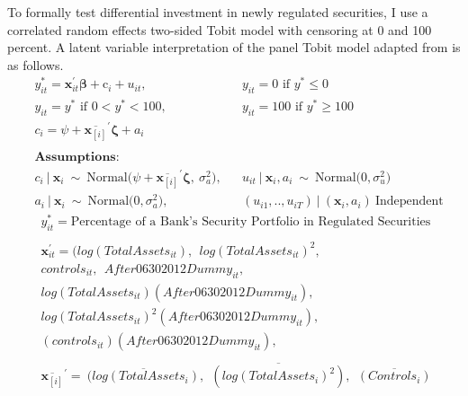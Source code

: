 \documentclass[preprint,12pt]{elsarticle}
\begin{document}
To formally test differential investment in newly regulated securities, I use a correlated random effects two-sided Tobit model with censoring at 0 and 100 percent.  A latent variable interpretation of the panel Tobit model adapted from \citep{Wooldridge2010} is as follows.
\begin{align*}
&y_{it}^{*} = \bm{x}_{it}^{'}\bm{\beta} + \text{c}_{i} + u_{it}, & &y_{it} = 0 \text{ if } y^{*} \leq 0 \nonumber \\
&y_{it} = y^{*} \text{ if } 0 < y^{*} < 100, & &y_{it} = 100 \text{ if } y^{*} \geq 100 \nonumber \\
&c_{i} = \psi + \overline{\bm{x}_{[i]}}^{'}\bm{\zeta} + a_{i} & 
\\
&\\
&\textbf{Assumptions:} \\
&c_{i} \ | \ \bm{x}_{i} \ \sim \ \text{Normal(} \psi + \overline{\bm{x}_{[i]}}^{'}\bm{\zeta}, \ \sigma_{a}^{2} \text{)}, & &u_{it} \ | \ \bm{x}_{i}, a_{i} \ \sim \ \text{Normal(} 0, \sigma_{u}^{2} \text{)} \\
&a_{i} \ | \ \bm{x}_{i} \ \sim \ \text{Normal(} 0, \sigma^{2}_{a} \text{)}, & &(u_{i1},..,u_{iT}) \ | \ (\bm{x}_{i},a_{i}) \ \textrm{Independent}  
\end{align*} 
\begin{align*}
& y_{it}^{*} = \text{Percentage of a Bank's Security Portfolio in Regulated Securities}  \\ 
\\
& \bm{x}_{it}^{'} = (log(Total Assets_{it}), \ \ log(Total Assets_{it})^{2},  \\
& controls_{it}, \ \ After06302012Dummy_{it}, \\
& log(TotalAssets_{it})(After06302012Dummy_{it}), \\
& log(TotalAssets_{it})^{2}(After06302012Dummy_{it}), \\
&(controls_{it})(After06302012Dummy_{it}), \\ 
\\
&\overline{\bm{x}_{[i]}} ^{'} =  \ \overline{(log(Total Assets_{i})}, \ \ \overline{(log(Total Assets_{i})^{2})}, \ \ \overline{(Controls_{i})} \  \
\end{align*} \\
\end{document}
